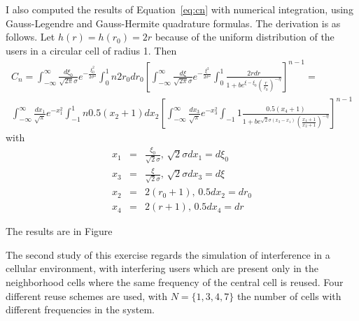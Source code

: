 \documentclass[10pt]{article}
\begin{document}
I also computed the results of Equation~\eqref{eq:cn} with numerical integration, using Gauss-Legendre and Gauss-Hermite quadrature formulas. The derivation is as follows. Let $h(r) = h(r_0) = 2r$ because of the uniform distribution of the users in a circular cell of radius 1. Then
\begin{eqnarray}
  C_n = \int_{-\infty}^{\infty} \frac{d\xi_0}{\sqrt{2\pi}\sigma} e^{-\frac{\xi_0^2}{2\sigma^2}} \int_0^1 n 2 r_0 dr_0 \left[
  \int_{-\infty}^{\infty} 
  \frac{d\xi}{\sqrt{2\pi}\sigma} 
  e^{-\frac{\xi^2}{2\sigma^2}} 
  \int_{0}^{1} 
  \frac{2r dr}{1 + b e^{\xi - \xi_0} \left( \frac{r}{r_0} \right)^{-\eta}}
  \right]^{n-1}
  = \\
  \int_{-\infty}^{\infty} \frac{dx_1}{\sqrt{\pi}}e^{-x_1^2}
  \int_{-1}^{1} n 0.5 (x_2 + 1) dx_2
  \left[
  \int_{-\infty}^{\infty} \frac{dx_3}{\sqrt{\pi}}e^{-x_3^2}
  \int_{-1}{1} \frac{0.5(x_4+1)}{1 + b e^{\sqrt{2}\sigma(x_3 - x_1)}\left( \frac{x_4+1}{x_2+1} \right)^{-\eta}}
  \right]^{n-1}
\end{eqnarray}
with 
\begin{eqnarray*}
x_1 &=& \frac{\xi_0}{\sqrt{2}\sigma}, \, \sqrt{2}\sigma dx_1 =  d\xi_0 \\
x_3 &=& \frac{\xi}{\sqrt{2}\sigma}, \, \sqrt{2}\sigma dx_3 = d\xi \\
x_2 &=& 2(r_0 + 1), \, 0.5 dx_2 = dr_0 \\
x_4 &=& 2(r + 1), \, 0.5 dx_4 = dr
\end{eqnarray*}

The results are in Figure

The second study of this exercise regards the simulation of interference in a cellular environment, with interfering users which are present only in the neighborhood cells where the same frequency of the central cell is reused. Four different reuse schemes are used, with $N = \{1, 3, 4, 7\}$ the number of cells with different frequencies in the system.
\end{document}

